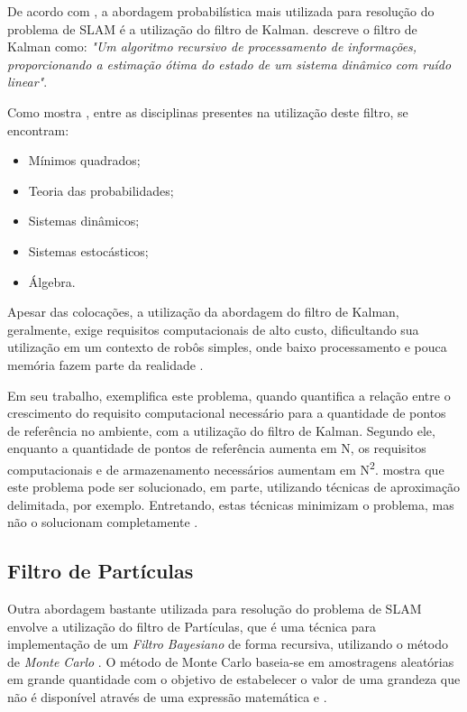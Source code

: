 De acordo com \cite{slamProblem}, a abordagem probabilística mais utilizada para resolução do problema de SLAM é a utilização do filtro de Kalman. \cite{theCleaningProject} descreve o filtro de Kalman como: \textit{"Um algoritmo recursivo de processamento de informações, proporcionando a estimação ótima do estado de um sistema dinâmico com ruído linear"}.

Como mostra \cite{theCleaningProject}, entre as disciplinas presentes na utilização deste filtro, se encontram:
\begin{itemize}
	\item Mínimos quadrados;
	\item Teoria das probabilidades;
	\item Sistemas dinâmicos;
	\item Sistemas estocásticos;
	\item Álgebra.
\end{itemize}

Apesar das colocações, a utilização da abordagem do filtro de Kalman, geralmente, exige requisitos computacionais de alto custo, dificultando sua utilização em um contexto de robôs simples, onde baixo processamento e pouca memória fazem parte da realidade \cite{agenteExploratorioKalman}.

 Em seu trabalho, \cite{slamProblem} exemplifica este problema, quando quantifica a relação entre o crescimento do requisito computacional necessário para a quantidade de pontos de referência no ambiente, com a utilização do filtro de Kalman. Segundo ele, enquanto a quantidade de pontos de referência aumenta em N, os requisitos computacionais e de armazenamento necessários aumentam em N\textsuperscript{2}. \cite{slamProblem} mostra que este problema pode ser solucionado, em parte, utilizando técnicas de aproximação delimitada, por exemplo. Entretando, estas técnicas minimizam o problema, mas não o solucionam completamente \cite{slamProblem}.


 \subsection{Filtro de Partículas} %
 \label{sub:filtro_de_partículas}

Outra abordagem bastante utilizada para resolução do problema de SLAM envolve a utilização do filtro de Partículas, que é uma técnica para implementação de um \textit{Filtro Bayesiano} de forma recursiva, utilizando o método de \textit{Monte Carlo} \cite{integrationVisionSLAMnonlinear}. O método de Monte Carlo baseia-se em amostragens aleatórias em grande quantidade com o objetivo de estabelecer o valor de uma grandeza que não é disponível através de uma expressão matemática \cite{mooney1997monte} e \cite{comparacaoKalmanParticulas}.

